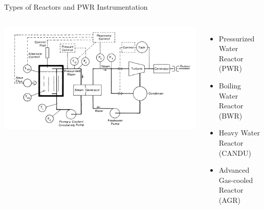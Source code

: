\documentclass{beamer}
\begin{document}
\begin{frame}{Types of Reactors and PWR Instrumentation}
  \begin{columns}
    \includegraphics[width=\textwidth]{instrumentation.png}

    \begin{itemize}
      \item Pressurized Water Reactor (PWR)
      \item Boiling Water Reactor (BWR)
      \item Heavy Water Reactor (CANDU)
      \item Advanced Gas-cooled Reactor (AGR)
    \end{itemize}
  \end{columns}
\end{frame}
\end{document}
